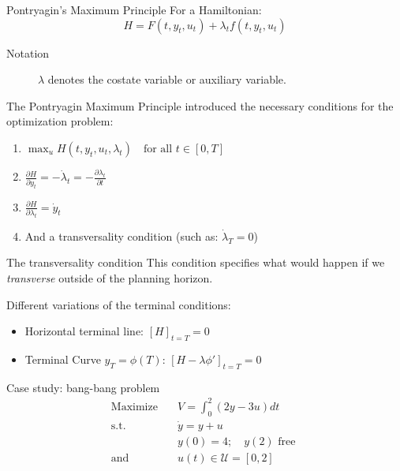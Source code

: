 \documentclass[10pt]{beamer}
\begin{document}
\begin{frame}[label={sec:org2b9e2da}]{Pontryagin's Maximum Principle}
For a Hamiltonian:
$$
H = F(t, y_{t}, u_{t}) + \lambda_{t} f(t, y_{t}, u_{t})
$$

\begin{description}
\item[{Notation}] \(\lambda\) denotes the \alert{costate variable} or \alert{auxiliary variable}.
\end{description}


The Pontryagin Maximum Principle introduced the \alert{necessary conditions} for the optimization problem:

\begin{enumerate}
\item \(\max_{u} H(t, y_{t}, u_{t}, \lambda_{t}) \quad \text{for all } t \in [0, T]\)
\item \(\frac{\partial H}{\partial y_{t}} = - \dot{\lambda}_{t} = - \frac{\partial \lambda_{t}}{\partial t}\)
\item \(\frac{\partial H}{\partial \lambda_t} = \dot{y}_t\)
\item And a transversality condition (such as: \(\dot{\lambda}_{T} = 0\))
\end{enumerate}
\end{frame}

\begin{frame}[label={sec:orge2f1b25}]{The transversality condition}
This condition specifies what would happen if we \emph{transverse} outside of the planning horizon.

Different variations of the terminal conditions:
\begin{itemize}
\item Horizontal terminal line: \([H]_{t=T} = 0\)
\item Terminal Curve \(y_{T} = \phi(T)\): \([H - \lambda\phi']_{t=T}=0\)
\end{itemize}
\end{frame}

\begin{frame}[label={sec:org95a6bb7}]{Case study: bang-bang problem}
\begin{align*}
\text{Maximize} \quad & V = \int_0^{2} (2y - 3u) dt \\
\text{s.t.} \quad     & \dot{y} = y + u \\
                  & y(0) = 4; \quad y(2) \text{ free } \\
\text{and} \quad      & u(t) \in \mathscr{U} = [0, 2]
\end{align*}
\end{frame}
\end{document}
